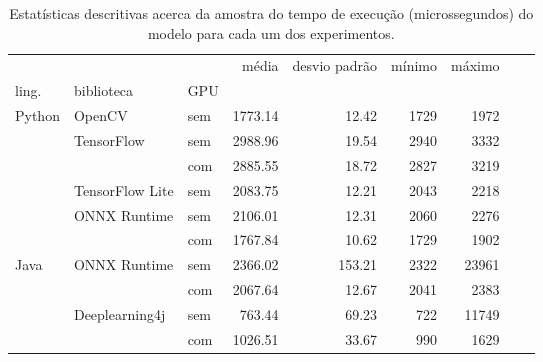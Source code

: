 \begin{table}
  \centering
  \begin{tabular}{lllrrrrrr}
    \toprule
           &                 &     & média   & desvio padrão & mínimo & máximo \\
    ling.  & biblioteca      & GPU &         &               &        &        \\
    \midrule
    Python & OpenCV          & sem & 1773.14 & 12.42         & 1729   & 1972   \\
           & TensorFlow      & sem & 2988.96 & 19.54         & 2940   & 3332   \\
           &                 & com & 2885.55 & 18.72         & 2827   & 3219   \\
           & TensorFlow Lite & sem & 2083.75 & 12.21         & 2043   & 2218   \\
           & ONNX Runtime    & sem & 2106.01 & 12.31         & 2060   & 2276   \\
           &                 & com & 1767.84 & 10.62         & 1729   & 1902   \\
    Java   & ONNX Runtime    & sem & 2366.02 & 153.21        & 2322   & 23961  \\
           &                 & com & 2067.64 & 12.67         & 2041   & 2383   \\
           & Deeplearning4j  & sem & 763.44  & 69.23         & 722    & 11749  \\
           &                 & com & 1026.51 & 33.67         & 990    & 1629   \\

    \bottomrule
  \end{tabular}
  \caption{Estatísticas descritivas acerca da amostra do tempo de execução (microssegundos) do modelo para cada um dos experimentos.}
  \label{tab:all}
\end{table}

